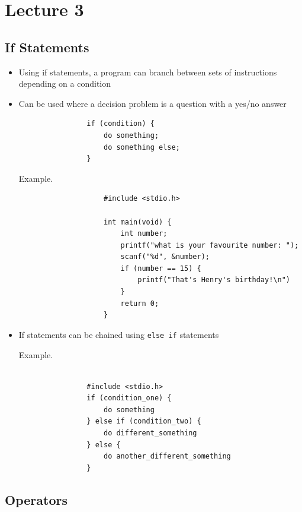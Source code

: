 \documentclass{article}
\begin{document}
\newpage

\section{Lecture 3}
	\subsection{If Statements}
		\begin{itemize}
			\item Using if statements, a program can branch between sets of instructions depending on a condition
			\item Can be used where a decision problem is a question with a yes/no answer

			\begin{verbatim}
				if (condition) {
					do something;
					do something else;
				}
			\end{verbatim}

			\begin{question}{Example.}
				\begin{verbatim}
					#include <stdio.h>

					int main(void) {
						int number;
						printf("what is your favourite number: ");
						scanf("%d", &number);
						if (number == 15) {
							printf("That's Henry's birthday!\n")
						}
						return 0;
					}

				\end{verbatim}
			\end{question}

		\item If statements can be chained using \texttt{else if} statements

		\begin{question}{Example.}
			\begin{verbatim}

				#include <stdio.h>
				if (condition_one) {
					do something
				} else if (condition_two) {
					do different_something
				} else {
					do another_different_something
				}

			\end{verbatim}
		\end{question}

		\end{itemize}

	\subsection{Operators}
\end{document}
